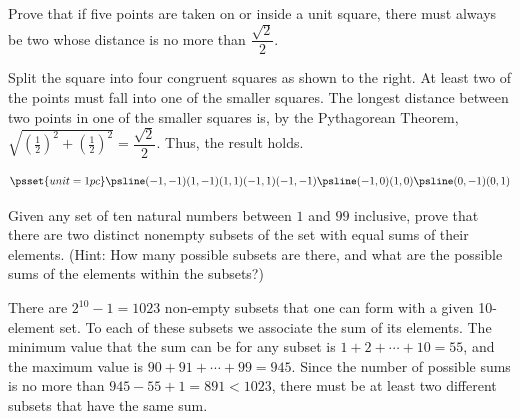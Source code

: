 \begin{exa}\label{exa:unit_square}
Prove that if five points are taken on or inside a unit square,
there must always be two whose distance is no more than $\dfrac{\sqrt{2}}{2}$.

\noindent
\begin{minipage}[t]{.85\textwidth}
\begin{sol} 
Split the square into four congruent squares as shown to the right. 
At least two of the points must fall into one
of the smaller squares. 
The longest distance between two points in one of the smaller squares is, 
by the
Pythagorean Theorem, $\sqrt{(\frac{1}{2})^2 + (\frac{1}{2})^2} =
\dfrac{\sqrt{2}}{2}$.  Thus, the result holds.
\end{sol}
\end{minipage}
\hfill
\begin{minipage}[t]{.15\textwidth}
$$ \psset{unit=1pc} \psline(-1,-1)(1,-1)(1,1)(-1,1)(-1,-1)
\psline(-1,0)(1,0)
\psline(0,-1)(0,1) $$
\end{minipage}
\end{exa}

\begin{exa} 
Given any set of ten natural numbers between $1$ and $99$
inclusive, prove that there are two distinct nonempty subsets of
the set with equal sums of their elements.
(Hint:  How many possible subsets are there, and what are the possible sums
of the elements within the subsets?)
\begin{sol}
There are $2^{10} - 1 = 1023$ non-empty subsets that one can form
with a given 10-element set. To each of these subsets we associate
the sum of its elements. The minimum value that the sum can be
for any subset is $1+2+\cdots+10=55$, and 
the maximum value is $90 + 91 + \cdots + 99 = 945.$ Since
the number of possible sums is no more than $945-55+1=891<1023$, there
must be at least two different subsets that have the same sum.
\end{sol}
 \end{exa} 
 
%

